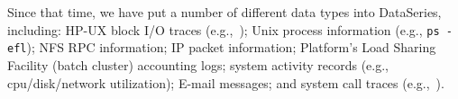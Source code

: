Since that time, we have put a number of different data types into DataSeries,
including:
HP-UX block I/O traces (e.g.,~\cite{Ji03,Uysal03});
Unix process information (e.g., {\tt ps -efl});
NFS RPC information;
IP packet information;
Platform's Load Sharing Facility (batch cluster) accounting logs;
system activity records (e.g., cpu/disk/network utilization);
E-mail messages;
and system call traces (e.g.,~\cite{Soules05}).


%


